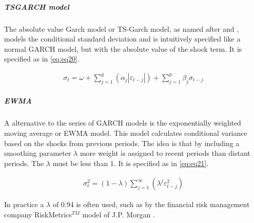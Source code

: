 \documentclass[a4paper, twoside]{templates/ociamthesis}
\newcommand*{\bibtitle}{Works Cited}
\begin{document}
\hypertarget{tsgarch-model}{%
\subparagraph{TSGARCH model}\label{tsgarch-model}}

\noindent The absolute value Garch model or TS-Garch model, as named after \textcite{taylor1986} and \textcite{schwert1989}, models the conditional standard deviation and is intuitively specified like a normal GARCH model, but with the absolute value of the shock term. It is specified as in \eqref{eq:eq20}.

\begin{align}
\sigma_t = \omega + \sum\limits_{j=1}^q (\alpha_j \left|\varepsilon_{t-j}\right|) +
\sum\limits_{j = 1}^p \beta_j \sigma_{t-j}
 \label{eq:eq20}
\end{align}

\newpage

\hypertarget{ewma}{%
\subparagraph{EWMA}\label{ewma}}

\noindent A alternative to the series of GARCH models is the exponentially weighted moving average or EWMA model. This model calculates conditional variance based on the shocks from previous periods. The idea is that by including a smoothing parameter \(\lambda\) more weight is assigned to recent periods than distant periods. The \(\lambda\) must be less than 1. It is specified as in \eqref{eq:eq21}.

\begin{align}
\sigma_t^2 = (1-\lambda) \sum\limits_{j=1}^\infty (\lambda^j \varepsilon_{t-j}^2)
 \label{eq:eq21}
\end{align}

In practice a \(\lambda\) of 0.94 is often used, such as by the financial risk management company RiskMetrics\(^{TM}\) model of J.P. Morgan \autocite{morganguarantytrustcompany1996}.




\setlength{\baselineskip}{0pt} %

{\renewcommand*\MakeUppercase[1]{#1}%
\printbibliography[heading=bibintoc,title={\bibtitle}]}
\end{document}
